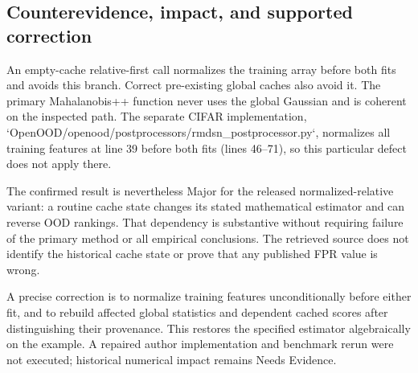 \documentclass[10pt]{article}
\begin{document}
\subsection*{Counterevidence, impact, and supported correction}
An empty-cache relative-first call normalizes the training array before both fits and avoids this branch. Correct pre-existing global caches also avoid it. The primary Mahalanobis++ function never uses the global Gaussian and is coherent on the inspected path. The separate CIFAR implementation, `OpenOOD/openood/postprocessors/rmdsn\_postprocessor.py`, normalizes all training features at line 39 before both fits (lines 46–71), so this particular defect does not apply there.\par
The confirmed result is nevertheless Major for the released normalized-relative variant: a routine cache state changes its stated mathematical estimator and can reverse OOD rankings. That dependency is substantive without requiring failure of the primary method or all empirical conclusions. The retrieved source does not identify the historical cache state or prove that any published FPR value is wrong.\par
A precise correction is to normalize training features unconditionally before either fit, and to rebuild affected global statistics and dependent cached scores after distinguishing their provenance. This restores the specified estimator algebraically on the example. A repaired author implementation and benchmark rerun were not executed; historical numerical impact remains Needs Evidence.\par
\end{document}
